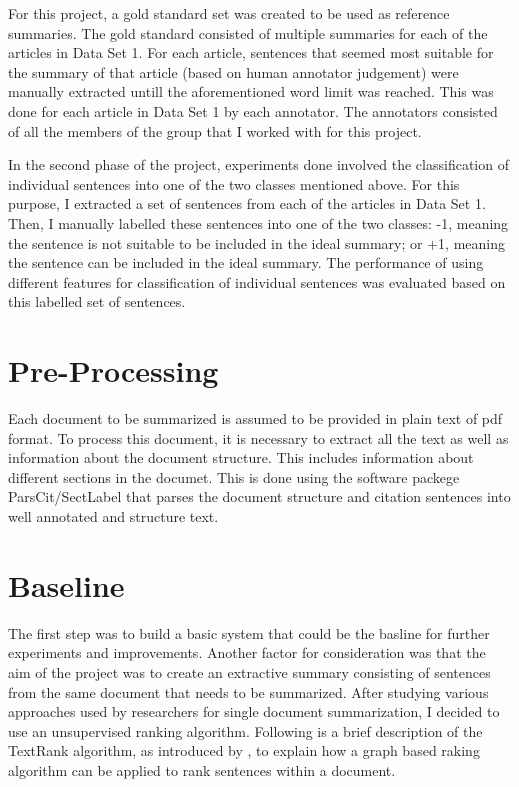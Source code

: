 For this project, a gold standard set was created to be used as reference summaries.
The gold standard consisted of multiple summaries for each of the articles in Data Set 1.
For each article, sentences that seemed most suitable for the summary of that article (based on human annotator judgement) were manually extracted untill the aforementioned word limit was reached.
This was done for each article in Data Set 1 by each annotator.
The annotators consisted of all the members of the group that I worked with for this project.

In the second phase of the project, experiments done involved the classification of individual sentences into one of the two classes mentioned above.
For this purpose, I extracted a set of sentences from each of the articles in Data Set 1.
Then, I manually labelled these sentences into one of the two classes: -1, meaning the sentence is not suitable to be included in the ideal summary; or +1, meaning the sentence can be included in the ideal summary.
The performance of using different features for classification of individual sentences was evaluated based on this labelled set of sentences.

\section{Pre-Processing}
Each document to be summarized is assumed to be provided in plain text of pdf format.
To process this document, it is necessary to extract all the text as well as information about the document structure.
This includes information about different sections in the documet.
This is done using the software packege ParsCit/SectLabel that parses the document structure and citation sentences into well annotated and structure text.

\section{Baseline}
The first step was to build a basic system that could be the basline for further experiments and improvements.
Another factor for consideration was that the aim of the project was to create an extractive summary consisting of sentences from the same document that needs to be summarized.
After studying various approaches used by researchers for single document summarization, I decided to use an unsupervised ranking algorithm.
Following is a brief description of the TextRank algorithm, as introduced by \cite{Mihalcea et. al.[]}, to explain how a graph based raking algorithm can be applied to rank sentences within a document.


